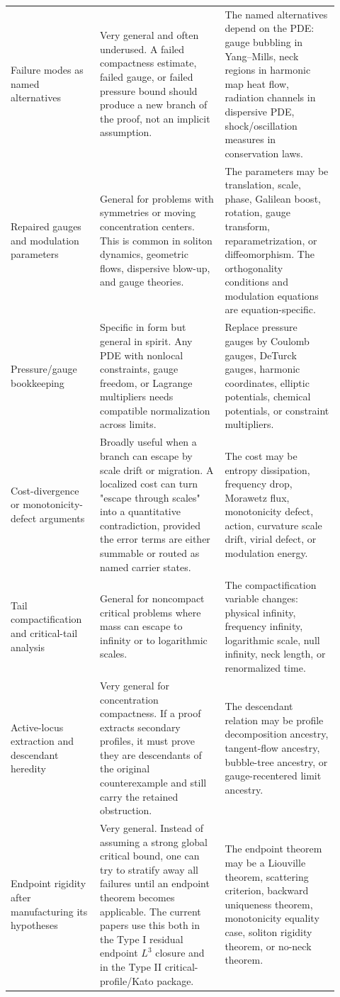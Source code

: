 \documentclass[11pt]{amsart}
\begin{document}
\begin{longtable}{@{}>{\raggedright\arraybackslash}p{0.25\linewidth}>{\raggedright\arraybackslash}p{0.35\linewidth}>{\raggedright\arraybackslash}p{0.32\linewidth}@{}}
Failure modes as named alternatives & Very general and often underused.  A failed compactness estimate, failed gauge, or failed pressure bound should produce a new branch of the proof, not an implicit assumption. & The named alternatives depend on the PDE: gauge bubbling in Yang--Mills, neck regions in harmonic map heat flow, radiation channels in dispersive PDE, shock/oscillation measures in conservation laws. \\
Repaired gauges and modulation parameters & General for problems with symmetries or moving concentration centers.  This is common in soliton dynamics, geometric flows, dispersive blow-up, and gauge theories. & The parameters may be translation, scale, phase, Galilean boost, rotation, gauge transform, reparametrization, or diffeomorphism.  The orthogonality conditions and modulation equations are equation-specific. \\
Pressure/gauge bookkeeping & Specific in form but general in spirit.  Any PDE with nonlocal constraints, gauge freedom, or Lagrange multipliers needs compatible normalization across limits. & Replace pressure gauges by Coulomb gauges, DeTurck gauges, harmonic coordinates, elliptic potentials, chemical potentials, or constraint multipliers. \\
Cost-divergence or monotonicity-defect arguments & Broadly useful when a branch can escape by scale drift or migration.  A localized cost can turn "escape through scales" into a quantitative contradiction, provided the error terms are either summable or routed as named carrier states. & The cost may be entropy dissipation, frequency drop, Morawetz flux, monotonicity defect, action, curvature scale drift, virial defect, or modulation energy. \\
Tail compactification and critical-tail analysis & General for noncompact critical problems where mass can escape to infinity or to logarithmic scales. & The compactification variable changes: physical infinity, frequency infinity, logarithmic scale, null infinity, neck length, or renormalized time. \\
Active-locus extraction and descendant heredity & Very general for concentration compactness.  If a proof extracts secondary profiles, it must prove they are descendants of the original counterexample and still carry the retained obstruction. & The descendant relation may be profile decomposition ancestry, tangent-flow ancestry, bubble-tree ancestry, or gauge-recentered limit ancestry. \\
Endpoint rigidity after manufacturing its hypotheses & Very general.  Instead of assuming a strong global critical bound, one can try to stratify away all failures until an endpoint theorem becomes applicable.  The current papers use this both in the Type I residual endpoint \(L^3\) closure and in the Type II critical-profile/Kato package. & The endpoint theorem may be a Liouville theorem, scattering criterion, backward uniqueness theorem, monotonicity equality case, soliton rigidity theorem, or no-neck theorem. \\

\end{longtable}
\end{document}
